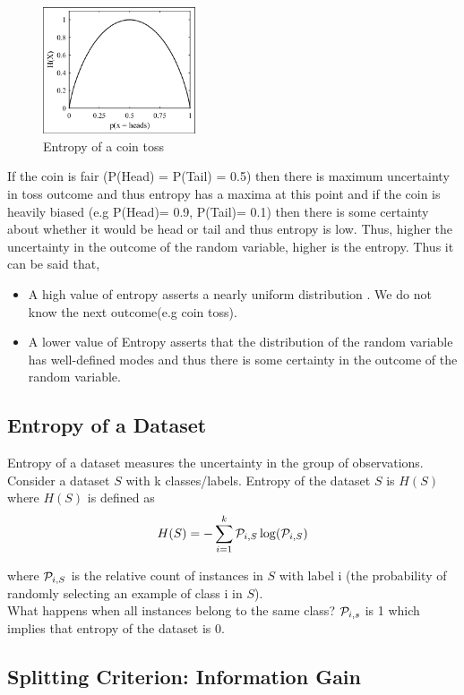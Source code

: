 \begin{figure}[H]
  \centering
  \includegraphics[width=0.4\textwidth]{images/05_11.png}
  \caption{Entropy of a coin toss}
\end{figure}

If the coin is fair (P(Head) = P(Tail) = 0.5) then there is maximum uncertainty in  toss outcome and thus entropy has a maxima at this point and if the coin is heavily biased (e.g P(Head)= 0.9, P(Tail)= 0.1) then there is some certainty about whether it would be head or tail and thus entropy is low. Thus, higher the uncertainty in the outcome of the random variable, higher is the entropy.
Thus it can be said that,
\begin{itemize}
  \item A high value of entropy asserts a nearly uniform distribution . We do not know the next outcome(e.g coin toss).
  \item A lower value of Entropy asserts that the distribution of the random variable has well-defined modes and thus there is some certainty in the outcome of the random variable.
\end{itemize}

\subsection{Entropy of a Dataset}

Entropy of a dataset measures the uncertainty in the group of observations. Consider a dataset $S$ with k classes/labels. Entropy of the dataset $S$ is $H(S)$ where $H(S)$ is defined as
$$
  H(S) =  -\sum_{i=1}^{k} \mathcal{P}_{i,S}\log (\mathcal{P}_{i,S})
$$

where $\mathcal{P}_{i,S}$ is the relative count of instances in $S$ with label i (the probability of randomly selecting an example of class i in $S$).\\
What happens when all instances belong to the same class? $\mathcal{P}_{i,s}$ is 1 which implies that entropy of the dataset is 0.

\subsection{Splitting Criterion: Information Gain}

